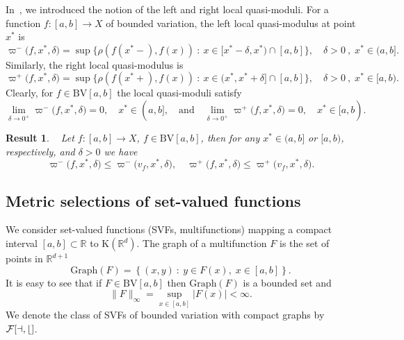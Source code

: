 \documentclass[final,3p,mathptmx]{article}%
\newcommand{\R}{{\mathbb R}}
\newcommand{\Rd}{{\R}^d}
\newcommand{\Comp}{\mathrm{K}(\Rd)}
\newcommand{\Graph}{{\mathrm{Graph}}}
\newcommand{\BV}{\mathrm{BV}[a,b]}
\newcommand{\calF}{\cal{F}[a,b]}
\newcommand{\NewLeftLocalModul}[3]{\varpi^{-}\big( {#1},{#2},{#3} \big)}
\newcommand{\NewRightLocalModul}[3]{\varpi^{+}\big( {#1},{#2},{#3} \big)}
\newtheorem{result}[remark]{Result}
\begin{document}
{{{{In~\cite{BDFM:2021}, we introduced the notion of the left and right local quasi-moduli.
For a function $f : [a,b] \to X$ of bounded variation, the left local quasi-modulus at point $x^*$ is
$$
	\NewLeftLocalModul{f}{x^*}{\delta} = \sup{ \big \{ \rho(f(x^*-),f(x)) \ : \ x \in [x^*-\delta,x^*) \cap [a,b] \big\} }, \quad \delta >0\ , \; x^* \in (a,b].
$$
Similarly, the right local quasi-modulus is
$$
	\NewRightLocalModul{f}{x^*}{\delta} = \sup{ \{ \rho(f(x^*+),f(x)) \ : \ x \in (x^*,x^* + \delta] \cap [a,b] \} }, \quad \delta >0\ , \; x^* \in [a,b).
$$
Clearly, for $f \in \BV$ the local quasi-moduli satisfy
$$
	\lim_{ \delta \to 0^+ } \NewLeftLocalModul{f}{x^*}{\delta}=0, \quad x^* \in (a,b],
	\quad \text{and} \quad
	\lim_{ \delta \to 0^+ } \NewRightLocalModul{f}{x^*}{\delta} =0 , \quad x^* \in [a,b) .
$$

\begin{result}\label{Lemma_QuasiMod_f<=QuasiMod_v_f}~\cite[Lemma~2.5]{BDFM:2022}
	Let $f : [a,b] \to X$, $f \in \BV$, then for any $x^*\in (a,b]$ or $[a,b)$, respectively,  and $ \delta>0$ we have
	$$
	\NewLeftLocalModul{f}{x^*}{\delta} \le \NewLeftLocalModul{v_f}{x^*}{\delta}, \quad  \NewRightLocalModul{f}{x^*}{\delta} \le \NewRightLocalModul{v_f}{x^*}{\delta}.
	$$
\end{result}

\subsection {Metric selections of set-valued functions }\label{Sect_MS_MetIntegral}

We consider set-valued functions (SVFs, multifunctions) mapping a compact interval $[a,b] \subset \R$ to $\Comp$. 
The graph of a multifunction $F$ is the set of points in $\R^{d+1}$ 
$$
\Graph(F)= \left \{(x,y) \ : \ y\in F(x),\; x \in [a,b] \right \}.
$$
It is easy to see that if $F \in  \BV$ then $\Graph(F)$ is a bounded set and 
$$
\|F\|_\infty =  \sup_{x\in[a,b]} | F(x) | <  \infty . 
$$
We denote the class of SVFs of bounded variation with compact graphs by~$\calF$. 



}}}}
\end{document}
